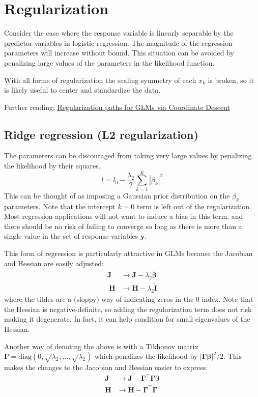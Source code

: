 \documentclass{article}
\newcommand{\bbeta}{\boldsymbol{\beta}}
\begin{document}
\section{Regularization}

Consider the case where the response variable is linearly separable by the
predictor variables in logistic regression. The magnitude of the regression
parameters will increase without bound. This situation can be avoided by
penalizing large values of the parameters in the likelihood function. 

With all forms of regularization the scaling symmetry of each \(x_k\) is
broken, so it is likely useful to center and standardize the data.

Further reading: \href{https://doi.org/10.18637/jss.v033.i01}{Regularization
paths for GLMs via Coordinate Descent}

\subsection{Ridge regression (L2 regularization)}

The parameters can be discouraged from taking very large values by penalizing
the likelihood by their squares.
\[ l = l_0 - \frac{\lambda_2}{2} \sum_{k=1}^K \left| \beta_{k} \right|^2 \]
This can be thought of as imposing a Gaussian prior distribution on the
\(\beta_k\) parameters. Note that the intercept \(k=0\) term is left out of
the regularization. Most regression applications will not want to induce a bias
in this term, and there should be no risk of failing to converge so long as
there is more than a single value in the set of response variables
\(\mathbf{y}\).

This form of regression is particularly attractive in GLMs because the Jacobian
and Hessian are easily adjusted:
\begin{align}
\mathbf{J} &\rightarrow \mathbf{J} - \lambda_2 \tilde{\bbeta} \\\
\mathbf{H} &\rightarrow \mathbf{H} - \lambda_2 \tilde{\mathbf{I}}
\end{align}
where the tildes are a (sloppy) way of indicating zeros in the \(0\) index.
Note that the Hessian is negative-definite, so adding the regularization term
does not risk making it degenerate. In fact, it can help condition for small
eigenvalues of the Hessian.

Another way of denoting the above is with a Tikhonov matrix
\(\boldsymbol{\Gamma} = \textrm{diag}(0, \sqrt{\lambda_2}, \ldots,
\sqrt{\lambda_2})\) which penalizes the likelihood by
\(\left|\boldsymbol{\Gamma}\bbeta\right|^2/2\). This makes the
changes to the Jacobian and Hessian easier to express.
\begin{align}
\mathbf{J} &\rightarrow \mathbf{J} - \boldsymbol{\Gamma}^\intercal\boldsymbol{\Gamma}\bbeta \\
\mathbf{H} &\rightarrow \mathbf{H} - \boldsymbol{\Gamma}^\intercal\boldsymbol{\Gamma}
\end{align}
\end{document}
